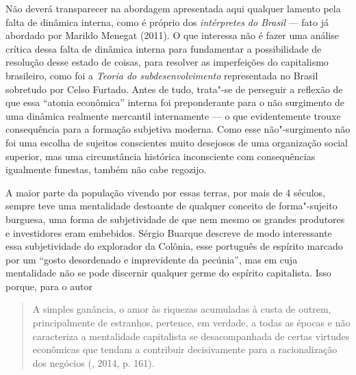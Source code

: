 Não deverá
transparecer na abordagem apresentada aqui qualquer lamento pela falta de dinâmica
interna, como é próprio dos \emph{intérpretes do Brasil} --- fato já
abordado por Marildo Menegat (2011). O que interessa não é fazer uma
análise crítica dessa falta de dinâmica interna para fundamentar a
possibilidade de resolução desse estado de coisas, para resolver as
imperfeições do capitalismo brasileiro, como foi a \emph{Teoria do
subdesenvolvimento} representada no Brasil sobretudo por Celso Furtado.
Antes de tudo, trata"-se de perseguir a reflexão de que essa ``atonia
econômica'' interna foi preponderante para o não surgimento de uma
dinâmica realmente mercantil internamente --- o que evidentemente trouxe
consequência para a formação subjetiva moderna. Como esse não"-surgimento não
foi uma escolha de sujeitos conscientes muito desejosos de uma
organização social superior, mas uma circunstância histórica
inconsciente com consequências igualmente funestas, também não cabe
regozijo.

A maior parte da população vivendo por essas terras, por mais de 4 séculos, sempre
teve uma mentalidade destoante de qualquer conceito de forma"-sujeito burguesa, uma
forma de subjetividade de que nem mesmo os grandes produtores e investidores eram
embebidos. Sérgio Buarque descreve de modo interessante essa
subjetividade do explorador da Colônia, esse português de espírito
marcado por um ``gosto desordenado e imprevidente da pecúnia'', mas em
cuja mentalidade não se pode discernir qualquer germe do espírito
capitalista. Isso porque, para o autor

\begin{quote}
A simples ganância, o amor às riquezas acumuladas à custa de outrem,
principalmente de estranhos, pertence, em verdade, a todas as épocas e
não caracteriza a mentalidade capitalista se desacompanhada de certas
virtudes econômicas que tendam a contribuir decisivamente para a
racionalização dos negócios (, 2014, p. 161).
\end{quote}

